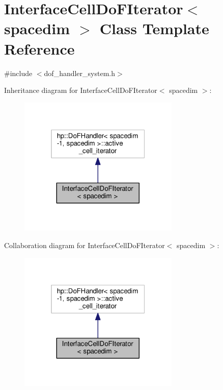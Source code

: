 \hypertarget{class_interface_cell_do_f_iterator}{}\section{Interface\+Cell\+Do\+F\+Iterator$<$ spacedim $>$ Class Template Reference}
\label{class_interface_cell_do_f_iterator}


{\ttfamily \#include $<$dof\+\_\+handler\+\_\+system.\+h$>$}



Inheritance diagram for Interface\+Cell\+Do\+F\+Iterator$<$ spacedim $>$\+:\nopagebreak
\begin{figure}[H]
\begin{center}
\leavevmode
\includegraphics[width=217pt]{class_interface_cell_do_f_iterator__inherit__graph}
\end{center}
\end{figure}


Collaboration diagram for Interface\+Cell\+Do\+F\+Iterator$<$ spacedim $>$\+:\nopagebreak
\begin{figure}[H]
\begin{center}
\leavevmode
\includegraphics[width=217pt]{class_interface_cell_do_f_iterator__coll__graph}
\end{center}
\end{figure}
